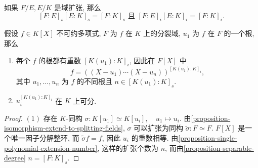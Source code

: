 \begin{corollary}
  如果 \( F/E, E/K \) 是域扩张, 那么
  \[
    [F:E]_s[E:K]_s = [F:K]_s \text{ 且 } [F:E]_i [E:K]_i = [F:K]_i.
  \]
\end{corollary}

\begin{corollary}
  \label{corollary-minimal-polynomial-of-algebraic-element}
  假设 \( f \in K[X] \) 不可约多项式, \( F \) 为 \( f \) 在 \( K \)
  上的分裂域, \( u_1 \) 为 \( f \) 在 \( F \) 的一个根, 那么
  \begin{enumerate}
    \item 每个 \( f \) 的根都有重数 \( [K(u_1): K]_i \), 因此在 \( F[X] \) 中
      \[
        f = ((X - u_1)\cdots (X - u_n))^{[K(u_1):K]_i},
      \]
      其中 \( u_1, \ldots, u_n \) 为 \( f \) 的不同根且 \( n \in [K(u_1):K]_s
      \).
    \item \( u_i^{[K(u_1):K]_i} \) 在 \( K \) 上可分.
  \end{enumerate}
\end{corollary}
\begin{proof}
  \( (1) \)
  存在 \( K \)-同构 \( \sigma: K[u_1] \simeq K[u_i],\quad u_1 \mapsto u_i \).
  由\cref{proposition-isomorphism-extend-to-splitting-fields}, \( \sigma \)
  可以扩张为同构 \( \widetilde{\sigma}: F \simeq F \).
  \( F[X] \) 是一个唯一因子分解整环, 而 \( \widetilde{\sigma}f = f \), 因此 \(
  u_i \) 的重数相等.
  由\cref{proposition-single-polynomial-extension-number}, 这样的扩张个数为 \(
  n \), 而由\cref{proposition-separable-degree} \( n = [F:K]_s \).
\end{proof}


